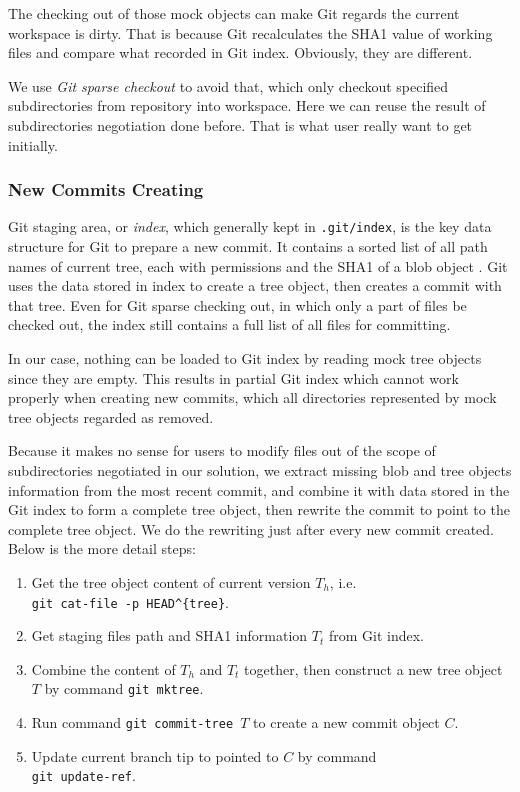 \documentclass[preprint]{sigplanconf}
\begin{document}
The checking out of those mock objects can make Git regards the current
workspace is dirty.
That is because Git recalculates the SHA1 value of working files and compare what recorded in Git index.
Obviously, they are different.

We use \emph{Git sparse checkout} \cite{sparseco} to avoid that, which only
checkout specified subdirectories from repository into workspace.
Here we can reuse the result of subdirectories negotiation done before.
That is what user really want to get initially.



\subsubsection{New Commits Creating}
Git staging area, or \emph{index}, which generally kept in \verb|.git/index|,
is the key data structure for Git to prepare a new commit.
It contains a sorted list of all path names of current tree, each with
permissions and the SHA1 of a blob object \cite{idx-format}.
Git uses the data stored in index to create a tree object, then creates a
commit with that tree.
Even for Git sparse checking out, in which only a part of files be checked
out, the index still contains a full list of all files for committing.

In our case, nothing can be loaded to Git index by reading mock tree objects
since they are empty.
This results in partial Git index which cannot work properly when creating new
commits, which all directories represented by mock tree objects regarded as
removed.

Because it makes no sense for users to modify files out of the scope of
subdirectories negotiated in our solution, we extract missing blob and tree
objects information from the most recent commit, and combine it with data
stored in the Git index to form a complete tree object, then rewrite the commit
to point to the complete tree object.
We do the rewriting just after every new commit created.
Below is the more detail steps:

\begin{enumerate}
  \item Get the tree object content of current version $T_h$, i.e. \\
        \verb|git cat-file -p HEAD^{tree}|.
  \item Get staging files path and SHA1 information $T_t$ from Git index.
  \item Combine the content of $T_h$ and $T_t$ together, then construct a new
        tree object $T$ by command \verb|git mktree|.
  \item Run command \verb|git commit-tree |$T$ to create a new commit object
        $C$.
  \item Update current branch tip to pointed to $C$ by command \\
        \verb|git update-ref|.
\end{enumerate}
\end{document}
